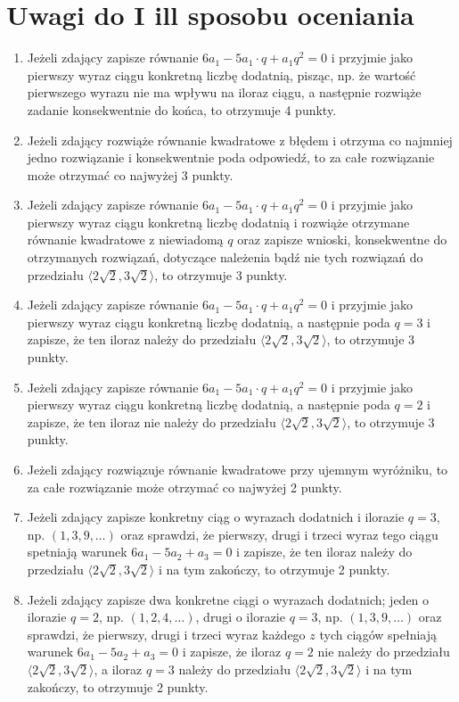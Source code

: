 \documentclass[10pt]{article}
\begin{document}
\section*{Uwagi do I ill sposobu oceniania}
\begin{enumerate}
  \item Jeżeli zdający zapisze równanie $6 a_{1}-5 a_{1} \cdot q+a_{1} q^{2}=0$ i przyjmie jako pierwszy wyraz ciągu konkretną liczbę dodatnią, pisząc, np. że wartość pierwszego wyrazu nie ma wpływu na iloraz ciągu, a następnie rozwiąże zadanie konsekwentnie do końca, to otrzymuje 4 punkty.
  \item Jeżeli zdający rozwiąże równanie kwadratowe z błędem i otrzyma co najmniej jedno rozwiązanie i konsekwentnie poda odpowiedź, to za całe rozwiązanie może otrzymać co najwyżej 3 punkty.
  \item Jeżeli zdający zapisze równanie $6 a_{1}-5 a_{1} \cdot q+a_{1} q^{2}=0$ i przyjmie jako pierwszy wyraz ciągu konkretną liczbę dodatnią i rozwiąże otrzymane równanie kwadratowe z niewiadomą $q$ oraz zapisze wnioski, konsekwentne do otrzymanych rozwiązań, dotyczące należenia bądź nie tych rozwiązań do przedziału $\langle 2 \sqrt{2}, 3 \sqrt{2}\rangle$, to otrzymuje 3 punkty.
  \item Jeżeli zdający zapisze równanie $6 a_{1}-5 a_{1} \cdot q+a_{1} q^{2}=0$ i przyjmie jako pierwszy wyraz ciągu konkretną liczbę dodatnią, a następnie poda $q=3$ i zapisze, że ten iloraz należy do przedziału $\langle 2 \sqrt{2}, 3 \sqrt{2}\rangle$, to otrzymuje 3 punkty.
  \item Jeżeli zdający zapisze równanie $6 a_{1}-5 a_{1} \cdot q+a_{1} q^{2}=0$ i przyjmie jako pierwszy wyraz ciągu konkretną liczbę dodatnią, a następnie poda $q=2$ i zapisze, że ten iloraz nie należy do przedziału $\langle 2 \sqrt{2}, 3 \sqrt{2}\rangle$, to otrzymuje 3 punkty.
  \item Jeżeli zdający rozwiązuje równanie kwadratowe przy ujemnym wyróżniku, to za całe rozwiązanie może otrzymać co najwyżej 2 punkty.
  \item Jeżeli zdający zapisze konkretny ciąg o wyrazach dodatnich i ilorazie $q=3$, np. $(1,3,9, \ldots)$ oraz sprawdzi, że pierwszy, drugi i trzeci wyraz tego ciągu spetniają warunek $6 a_{1}-5 a_{2}+a_{3}=0$ i zapisze, że ten iloraz należy do przedziału $\langle 2 \sqrt{2}, 3 \sqrt{2}\rangle$ i na tym zakończy, to otrzymuje 2 punkty.
  \item Jeżeli zdający zapisze dwa konkretne ciągi o wyrazach dodatnich; jeden o ilorazie $q=2$, np. $(1,2,4, \ldots)$, drugi o ilorazie $q=3$, np. $(1,3,9, \ldots)$ oraz sprawdzi, że pierwszy, drugi i trzeci wyraz każdego $z$ tych ciągów spełniają warunek $6 a_{1}-5 a_{2}+a_{3}=0$ i zapisze, że iloraz $q=2$ nie należy do przedziału $\langle 2 \sqrt{2}, 3 \sqrt{2}\rangle$, a iloraz $q=3$ należy do przedziału $\langle 2 \sqrt{2}, 3 \sqrt{2}\rangle$ i na tym zakończy, to otrzymuje 2 punkty.

\end{enumerate}
\end{document}
